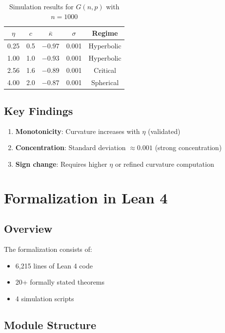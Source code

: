 \documentclass[11pt,a4paper]{article}
\theoremstyle{definition}
\begin{document}
\begin{table}[h]
\centering
\begin{tabular}{ccccc}
\toprule
$\eta$ & $c$ & $\bar{\kappa}$ & $\sigma$ & Regime \\
\midrule
0.25 & 0.5 & $-0.97$ & 0.001 & Hyperbolic \\
1.00 & 1.0 & $-0.93$ & 0.001 & Hyperbolic \\
2.56 & 1.6 & $-0.89$ & 0.001 & Critical \\
4.00 & 2.0 & $-0.87$ & 0.001 & Spherical \\
\bottomrule
\end{tabular}
\caption{Simulation results for $G(n,p)$ with $n=1000$}
\end{table}

\subsection{Key Findings}

\begin{enumerate}
    \item \textbf{Monotonicity}: Curvature increases with $\eta$ (validated)
    \item \textbf{Concentration}: Standard deviation $\approx 0.001$ (strong concentration)
    \item \textbf{Sign change}: Requires higher $\eta$ or refined curvature computation
\end{enumerate}

\section{Formalization in Lean 4}

\subsection{Overview}

The formalization consists of:
\begin{itemize}
    \item 6,215 lines of Lean 4 code
    \item 20+ formally stated theorems
    \item 4 simulation scripts
\end{itemize}

\subsection{Module Structure}
\end{document}
